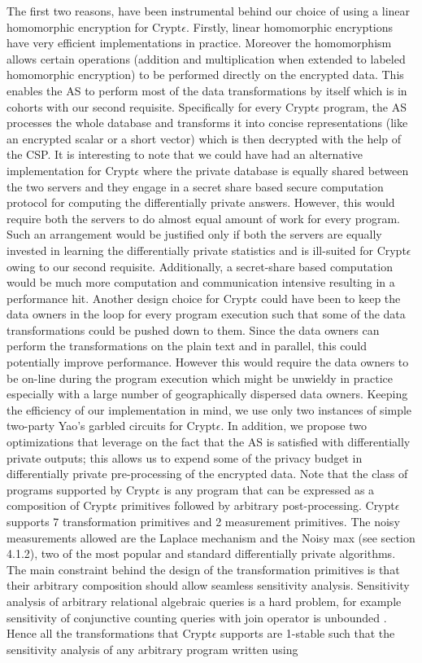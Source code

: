 The first two reasons, have been instrumental behind our choice of using a linear homomorphic encryption for Crypt$\epsilon$. Firstly, linear homomorphic encryptions have very efficient implementations in practice. Moreover the homomorphism allows certain operations (addition and multiplication when extended to labeled homomorphic encryption) to be performed directly on the encrypted data. This enables the \textsf{AS} to perform most of the data transformations by itself which is in cohorts with our second requisite. Specifically for every Crypt$\epsilon$ program, the \textsf{AS} processes the whole database and transforms it into concise representations (like an encrypted scalar or a short vector) which is then decrypted with the help of the \textsf{CSP}. It is interesting to note that we could have had an alternative implementation for Crypt$\epsilon$ where the private database is equally shared between the two servers and they engage in a secret share based secure computation protocol for computing the differentially private answers. However, this would require both the servers to do almost equal amount of work for every program. Such an arrangement would be justified only if both the servers are equally invested in learning the differentially private statistics and is ill-suited for Crypt$\epsilon$ owing to our second requisite. Additionally, a secret-share based computation would be much more computation and communication intensive resulting in a performance hit. Another design choice for Crypt$\epsilon$ could have been to keep the data owners in the loop for every program execution such that some of the data transformations could be pushed down to them. Since the data owners can perform the transformations on the plain text and in parallel, this could potentially improve performance. However this would require the data owners to be on-line during the program execution which might be unwieldy in practice especially with a large number of geographically dispersed data owners.  Keeping the efficiency of our implementation in mind, we use only two instances of simple two-party Yao's garbled circuits for Crypt$\epsilon$. In addition, we propose two optimizations that leverage on the fact that the AS is satisfied with differentially private outputs; this allows  us to expend some of the privacy budget in differentially private pre-processing of the encrypted data. Note that the class of programs supported by Crypt$\epsilon$ is any program that can be expressed as a composition of  Crypt$\epsilon$ primitives followed by arbitrary post-processing. Crypt$\epsilon$ supports 7 transformation primitives and 2 measurement primitives. The noisy measurements allowed are the Laplace mechanism and the Noisy max (see section 4.1.2), two of the most popular and standard differentially private algorithms. The main constraint behind the design of the transformation primitives is that their arbitrary composition should allow seamless sensitivity analysis.  Sensitivity analysis of arbitrary relational algebraic queries is a hard problem, for example sensitivity of conjunctive counting queries with join operator is unbounded \cite{sensitivity}. Hence all the transformations that Crypt$\epsilon$ supports are 1-stable such that the sensitivity analysis of any arbitrary program written using 